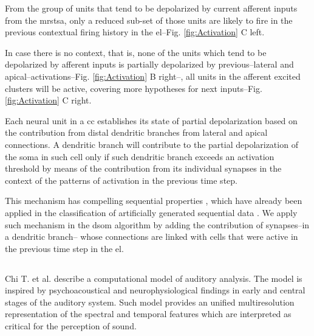 \documentclass[10pt,letterpaper]{article}
\begin{document}
From the group of units that tend to be depolarized by current afferent inputs from the \gls{mrstsa},
only a reduced sub-set of those units are likely to fire in the previous contextual firing history
in the \gls{el}--Fig. \ref{fig:Activation} C left.

In case there is no context, that is, none of the units which tend to be depolarized by afferent inputs
is partially depolarized by previous--lateral and apical--activations--Fig. \ref{fig:Activation} B right--,
all units in the afferent excited clusters will be active, covering more hypotheses for next inputs--Fig. \ref{fig:Activation} C right.

Each neural unit in a \gls{cc} establishes its state of partial depolarization based on the contribution from
distal dendritic branches from lateral and apical connections.
A dendritic branch will contribute to the partial depolarization of the soma in such cell only if such
dendritic branch exceeds an activation threshold by means of the contribution from its individual synapses
in the context of the patterns of activation in the previous time step.

This mechanism has compelling sequential properties \cite{hawkins_2016},
which have already been applied in the classification of artificially generated sequential data \cite{cui_2016}.
We apply such mechanism in the \gls{dsom} algorithm by adding the contribution of synapses--in a dendritic branch--
whose connections are linked with cells that were active in the previous time step in the \gls{el}.

















\subsection*{}
\label{sec-mrstsa}

Chi T. et al. \cite{chi_2005} describe a computational model of auditory analysis.
The model is inspired by psychoacoustical and
neurophysiological findings in early and central stages of the auditory system.
Such model 
provides
an unified multiresolution representation of the spectral and temporal features
which are
interpreted as critical for the perception of sound.
\end{document}
